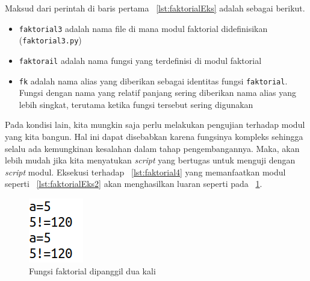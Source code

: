 

Maksud dari perintah di baris pertama \lstlistingname~\ref{lst:faktorialEks} adalah sebagai berikut.
\begin{itemize}
  \item \texttt{faktorial3} adalah nama file di mana modul faktorial didefinisikan (\texttt{faktorial3.py})
  \item \texttt{faktorail} adalah nama fungsi yang terdefinisi di modul faktorial
  \item \texttt{fk} adalah nama alias yang diberikan sebagai identitas fungsi \texttt{faktorial}. Fungsi dengan nama yang relatif panjang sering diberikan nama alias yang lebih singkat, terutama ketika fungsi tersebut sering digunakan
\end{itemize}



Pada kondisi lain, kita mungkin saja perlu melakukan pengujian terhadap modul yang kita bangun. Hal ini dapat disebabkan karena fungsinya kompleks sehingga selalu ada kemungkinan kesalahan dalam tahap pengembangannya. Maka, akan lebih mudah jika kita menyatukan \textit{script} yang bertugas untuk menguji dengan \textit{script} modul. Eksekusi terhadap \lstlistingname~\ref{lst:faktorial4} yang memanfaatkan modul seperti \lstlistingname~\ref{lst:faktorialEks2} akan menghasilkan luaran seperti pada \figurename~\ref{fig:modulUji}.





\begin{figure}
  \begin{center}
    \includegraphics[scale=2.0]{pics/modulUji.png}
    \caption{Fungsi faktorial dipanggil dua kali}
    \label{fig:modulUji}
  \end{center}
\end{figure}

